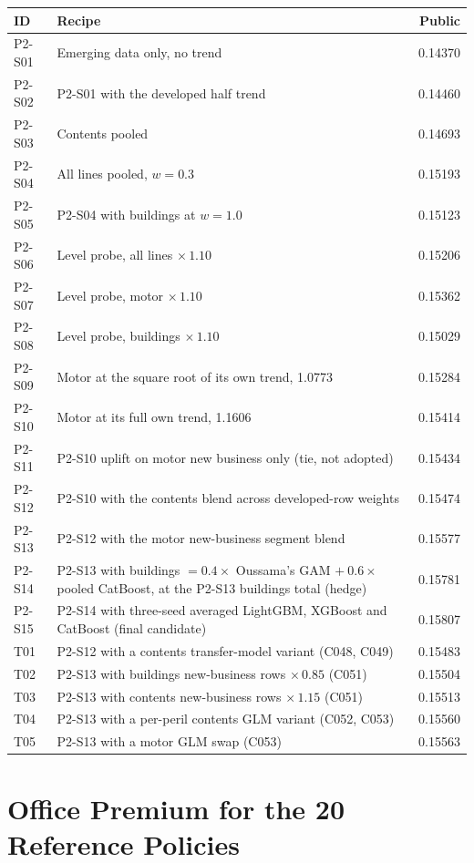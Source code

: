 \documentclass{rapport}
\begin{document}
\begin{center}
\small
\begin{tabular}{lp{10.4cm}r}
\hline
ID & Recipe & Public\\
\hline
P2-S01 & Emerging data only, no trend & 0.14370\\
P2-S02 & P2-S01 with the developed half trend & 0.14460\\
P2-S03 & Contents pooled & 0.14693\\
P2-S04 & All lines pooled, $w = 0.3$ & 0.15193\\
P2-S05 & P2-S04 with buildings at $w = 1.0$ & 0.15123\\
P2-S06 & Level probe, all lines $\times\,1.10$ & 0.15206\\
P2-S07 & Level probe, motor $\times\,1.10$ & 0.15362\\
P2-S08 & Level probe, buildings $\times\,1.10$ & 0.15029\\
P2-S09 & Motor at the square root of its own trend, 1.0773 & 0.15284\\
P2-S10 & Motor at its full own trend, 1.1606 & 0.15414\\
P2-S11 & P2-S10 uplift on motor new business only (tie, not adopted) & 0.15434\\
P2-S12 & P2-S10 with the contents blend across developed-row weights & 0.15474\\
P2-S13 & P2-S12 with the motor new-business segment blend & 0.15577\\
P2-S14 & P2-S13 with buildings $= 0.4\times$ Oussama's GAM $+\ 0.6\times$ pooled CatBoost, at the P2-S13 buildings total (hedge) & 0.15781\\
P2-S15 & P2-S14 with three-seed averaged LightGBM, XGBoost and CatBoost (final candidate) & 0.15807\\
T01 & P2-S12 with a contents transfer-model variant (C048, C049) & 0.15483\\
T02 & P2-S13 with buildings new-business rows $\times\,0.85$ (C051) & 0.15504\\
T03 & P2-S13 with contents new-business rows $\times\,1.15$ (C051) & 0.15513\\
T04 & P2-S13 with a per-peril contents GLM variant (C052, C053) & 0.15560\\
T05 & P2-S13 with a motor GLM swap (C053) & 0.15563\\
\hline
\end{tabular}
\end{center}

\clearpage
\section{Office Premium for the 20 Reference Policies}
\label{ov:app-op}
\end{document}
